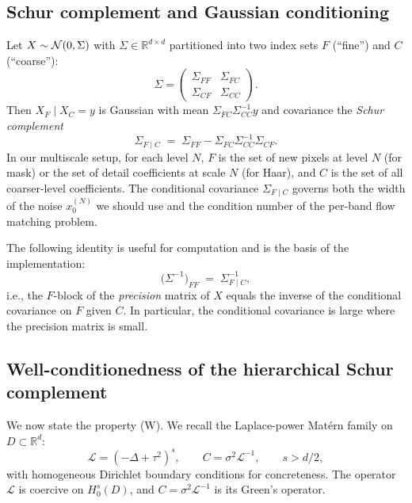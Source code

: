 \documentclass[11pt]{amsart}
\newcommand{\cL}{\mathcal{L}} \newcommand{\cF}{\mathcal{F}}
\newcommand{\bR}{\mathbb{R}} \newcommand{\bN}{\mathbb{N}}
\theoremstyle{remark}
\numberwithin{equation}{section}
\begin{document}
\subsection{Schur complement and Gaussian conditioning}
Let $X\sim\mathcal{N}(0,\Sigma)$ with $\Sigma\in\bR^{d\times d}$ partitioned into two index sets $F$ (``fine'') and $C$ (``coarse''):
\begin{equation}
 \Sigma = \begin{pmatrix} \Sigma_{FF} & \Sigma_{FC}\\ \Sigma_{CF} & \Sigma_{CC}\end{pmatrix}.
\end{equation}
Then $X_F\mid X_C=y$ is Gaussian with mean $\Sigma_{FC}\Sigma_{CC}^{-1}y$ and covariance the \emph{Schur complement}
\begin{equation}
\label{eq:schur}
 \Sigma_{F\mid C} \;=\; \Sigma_{FF} - \Sigma_{FC}\Sigma_{CC}^{-1}\Sigma_{CF}.
\end{equation}
In our multiscale setup, for each level $N$, $F$ is the set of new pixels at level $N$ (for mask) or the set of detail coefficients at scale $N$ (for Haar), and $C$ is the set of all coarser-level coefficients. The conditional covariance $\Sigma_{F\mid C}$ governs both the width of the noise $x_0^{(N)}$ we should use and the condition number of the per-band flow matching problem.

The following identity is useful for computation and is the basis of the implementation:
\begin{equation}
\label{eq:schur-block-inverse}
 \big(\Sigma^{-1}\big)_{FF} \;=\; \Sigma_{F\mid C}^{-1},
\end{equation}
i.e., the $F$-block of the \emph{precision} matrix of $X$ equals the inverse of the conditional covariance on $F$ given $C$. In particular, the conditional covariance is large where the precision matrix is small.

\subsection{Well-conditionedness of the hierarchical Schur complement}
We now state the property (W). We recall the Laplace-power Mat\'ern family on $D\subset\bR^d$:
\begin{equation}
\label{eq:matern}
 \cL = (-\Delta+\tau^2)^{s},\qquad C = \sigma^2\cL^{-1},\qquad s>d/2,
\end{equation}
with homogeneous Dirichlet boundary conditions for concreteness. The operator $\cL$ is coercive on $H_0^s(D)$, and $C=\sigma^2\cL^{-1}$ is its Green's operator.
\end{document}
